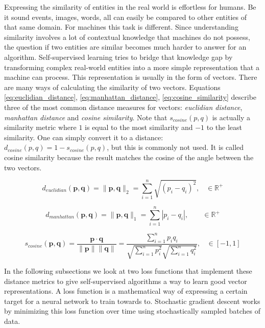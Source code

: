 Expressing the similarity of entities in the real world is effortless for humans. Be it sound events, images, words, all can easily be compared to other entities of that same domain. For machines this task is different. Since understanding similarity involves a lot of contextual knowledge that machines do not possess, the question if two entities are similar becomes much harder to answer for an algorithm. Self-supervised learning tries to bridge that knowledge gap by transforming complex real-world entities into a more simple representation that a machine can process. This representation is usually in the form of vectors. There are many ways of calculating the similarity of two vectors. Equations \ref{eq:euclidian_distance}, \ref{eq:manhattan_distance}, \ref{eq:cosine_similarity} describe three of the most common distance measures for vectors: \textit{euclidian distance}, \textit{manhattan distance} and \textit{cosine similarity}. Note that $s_{cosine}(p,q)$ is actually a similarity metric where $1$ is equal to the most similarity and $-1$ to the least similarity. One can simply convert it to a distance: $d_{cosine}(p,q) = 1 - s_{cosine}(p,q)$, but this is commonly not used. It is called cosine similarity because the result matches the cosine of the angle between the two vectors.

\begin{equation}
   d_{euclidian}(\mathbf{p},\mathbf{q}) = \lVert \mathbf{p,q} \rVert_2 = \sum_{i=1}^{n} \sqrt{(p_i - q_i)^2},\;\;\; \in \mathbb{R}^+
   \label{eq:euclidian_distance}
\end{equation}

\begin{equation}
   d_{manhattan}(\mathbf{p},\mathbf{q}) = \lVert \mathbf{p,q} \rVert_1 = \sum_{i=1}^{n} |p_i - q_i|,\;\;\;\;\;\;\; \in \mathbb{R}^+
   \label{eq:manhattan_distance}
\end{equation}

\begin{equation}
   s_{cosine}(\mathbf{p},\mathbf{q}) = \frac{\mathbf{p} \cdot \mathbf{q}}{\lVert \mathbf{p} \rVert \lVert \mathbf{q} \rVert} = \frac{\sum_{i=1}^{n}p_i q_i}{\sqrt{\sum_{i=1}^{n}p_i^2} \sqrt{\sum_{i=1}^{n}q_i^2}},\;\;\; \in [-1,1]
   \label{eq:cosine_similarity}
\end{equation}

In the following subsections we look at two loss functions that implement these distance metrics to give self-supervised algorithms a way to learn good vector representations. A loss function is a mathematical way of expressing a certain target for a neural network to train towards to. Stochastic gradient descent works by minimizing this loss function over time using stochastically sampled batches of data.

